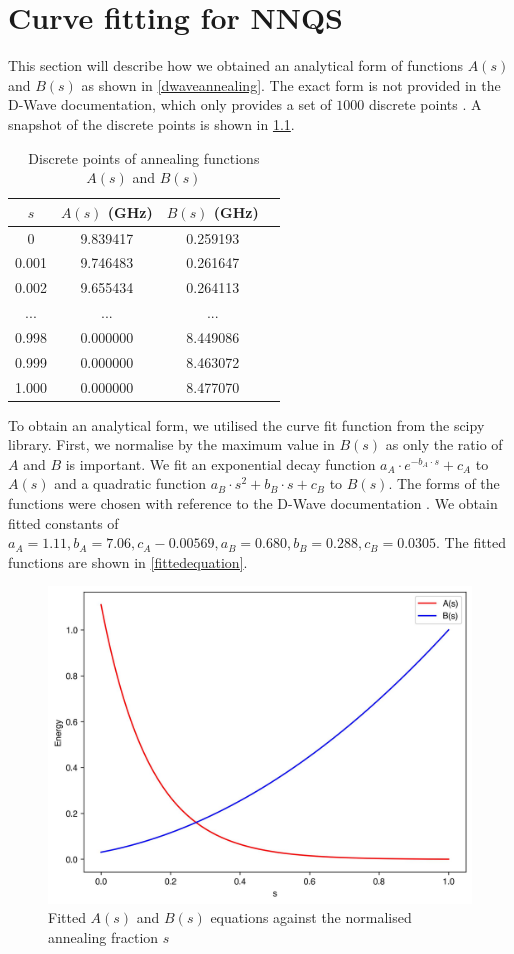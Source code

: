\chapter{Curve fitting for NNQS}\label{appendix:curvefitting}
This section will describe how we obtained an analytical form of functions $A(s)$ and $B(s)$ as shown in \autoref{dwaveannealing}. The exact form is not provided in the D-Wave documentation, which only provides a set of $1000$ discrete points \cite{dwavefunctions}. A snapshot of the discrete points is shown in \ref{tab:dwavefunction}.

\begin{table}[!h]
    \centering
    \caption{Discrete points of annealing functions $A(s)$ and $B(s)$}
    \label{tab:dwavefunction}
    \begin{tabular}{cccc}
    \hline
    $s$ & $A(s)$ (GHz) & $B(s)$ (GHz)\\
    \hline
    0 & 9.839417 & 0.259193 \\
    0.001 & 9.746483 & 0.261647 \\
    0.002 & 9.655434 & 0.264113 \\
    ... & ... & ... \\
    0.998 & 0.000000 & 8.449086 \\
    0.999 & 0.000000 & 8.463072 \\
    1.000 & 0.000000 & 8.477070 \\
    \hline
    \end{tabular}
\end{table}

To obtain an analytical form, we utilised the curve fit function from the scipy library. First, we normalise by the maximum value in $B(s)$ as only the ratio of $A$ and $B$ is important. We fit an exponential decay function $a_{A}\cdot e^{-b_{A}\cdot s} + c_{A}$ to $A(s)$ and a quadratic function $a_{B} \cdot s^2 + b_{B} \cdot s + c_{B}$ to $B(s)$. The forms of the functions were chosen with reference to the D-Wave documentation \cite{dwavefunctions}. We obtain fitted constants of $a_{A}=1.11, b_{A} = 7.06, c_A-0.00569, a_B = 0.680, b_B = 0.288, c_B = 0.0305$. The fitted functions are shown in \autoref{fittedequation}.
\begin{figure}[!h]
    \centering
    \includegraphics[width=0.6\linewidth]{images/fitted.jpg}
    \caption{Fitted $A(s)$ and $B(s)$ equations against the normalised annealing fraction $s$}
    \label{fittedequation}
\end{figure}